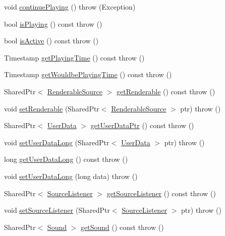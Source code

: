 \begin{DoxyCompactItemize}
\item 
void \hyperlink{classAudio_1_1Source_a65ce708851ffb9435948c3dfd6c891a0}{continue\+Playing} ()  throw (\+Exception)
\item 
bool \hyperlink{classAudio_1_1Source_aaceb400c059019233ace3b0c10206548}{is\+Playing} () const   throw ()
\item 
bool \hyperlink{classAudio_1_1Source_ab5e750c91839e53326a2d9af1d2f6575}{is\+Active} () const   throw ()
\item 
Timestamp \hyperlink{classAudio_1_1Source_a4096dd64ab51c7f98831be31c3dea77d}{get\+Playing\+Time} () const   throw ()
\item 
Timestamp \hyperlink{classAudio_1_1Source_a3eb1643f3fd12dc6f0d46f35136b1c64}{get\+Wouldbe\+Playing\+Time} () const   throw ()
\item 
Shared\+Ptr$<$ \hyperlink{classAudio_1_1RenderableSource}{Renderable\+Source} $>$ \hyperlink{classAudio_1_1Source_a694cc1bc15662a99fe81ec6861138191}{get\+Renderable} () const   throw ()
\item 
void \hyperlink{classAudio_1_1Source_a4bbbbb104024c91bf9f6317417b95d41}{set\+Renderable} (Shared\+Ptr$<$ \hyperlink{classAudio_1_1RenderableSource}{Renderable\+Source} $>$ ptr)  throw ()
\item 
Shared\+Ptr$<$ \hyperlink{classAudio_1_1UserData}{User\+Data} $>$ \hyperlink{classAudio_1_1Source_ac54fccdaeee22b1d2608e9c15c4cd664}{get\+User\+Data\+Ptr} () const   throw ()
\item 
void \hyperlink{classAudio_1_1Source_afb7ed5e9e1e062d31e768e8bbce77ca0}{set\+User\+Data\+Long} (Shared\+Ptr$<$ \hyperlink{classAudio_1_1UserData}{User\+Data} $>$ ptr)  throw ()
\item 
long \hyperlink{classAudio_1_1Source_afcce60125b2185a146da6babb5754129}{get\+User\+Data\+Long} () const   throw ()
\item 
void \hyperlink{classAudio_1_1Source_aef3f3d75b25de879d324bf4405691d9b}{set\+User\+Data\+Long} (long data)  throw ()
\item 
Shared\+Ptr$<$ \hyperlink{classAudio_1_1SourceListener}{Source\+Listener} $>$ \hyperlink{classAudio_1_1Source_a85357fe197446a435269b0c52ed5b1d1}{get\+Source\+Listener} () const   throw ()
\item 
void \hyperlink{classAudio_1_1Source_abcd9836d57cf4bbe0dd774467b5cc010}{set\+Source\+Listener} (Shared\+Ptr$<$ \hyperlink{classAudio_1_1SourceListener}{Source\+Listener} $>$ ptr)  throw ()
\item 
Shared\+Ptr$<$ \hyperlink{classAudio_1_1Sound}{Sound} $>$ \hyperlink{classAudio_1_1Source_ad429e1b3013169bad7583dcc88f38ec9}{get\+Sound} () const   throw ()

\end{DoxyCompactItemize}
